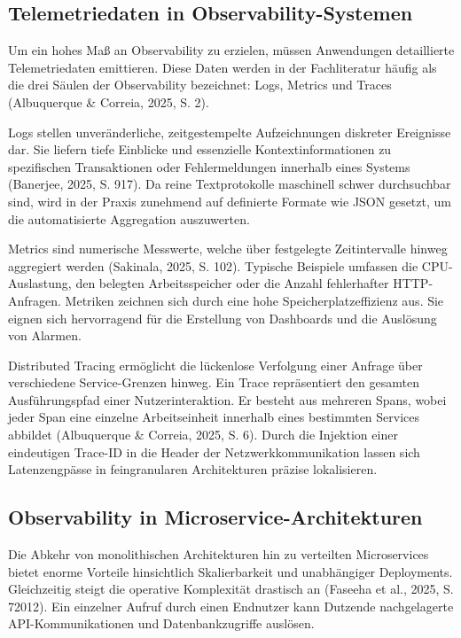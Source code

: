 \subsection{Telemetriedaten in Observability-Systemen}

Um ein hohes Maß an Observability zu erzielen, müssen Anwendungen detaillierte Telemetriedaten emittieren. Diese Daten werden in der Fachliteratur häufig als die drei Säulen der Observability bezeichnet: Logs, Metrics und Traces (Albuquerque \& Correia, 2025, S. 2).

Logs stellen unveränderliche, zeitgestempelte Aufzeichnungen diskreter Ereignisse dar. Sie liefern tiefe Einblicke und essenzielle Kontextinformationen zu spezifischen Transaktionen oder Fehlermeldungen innerhalb eines Systems (Banerjee, 2025, S. 917). Da reine Textprotokolle maschinell schwer durchsuchbar sind, wird in der Praxis zunehmend auf definierte Formate wie JSON gesetzt, um die automatisierte Aggregation auszuwerten.

Metrics sind numerische Messwerte, welche über festgelegte Zeitintervalle hinweg aggregiert werden (Sakinala, 2025, S. 102). Typische Beispiele umfassen die CPU-Auslastung, den belegten Arbeitsspeicher oder die Anzahl fehlerhafter HTTP-Anfragen. Metriken zeichnen sich durch eine hohe Speicherplatzeffizienz aus. Sie eignen sich hervorragend für die Erstellung von Dashboards und die Auslösung von Alarmen.

Distributed Tracing ermöglicht die lückenlose Verfolgung einer Anfrage über verschiedene Service-Grenzen hinweg. Ein Trace repräsentiert den gesamten Ausführungspfad einer Nutzerinteraktion. Er besteht aus mehreren Spans, wobei jeder Span eine einzelne Arbeitseinheit innerhalb eines bestimmten Services abbildet (Albuquerque \& Correia, 2025, S. 6). Durch die Injektion einer eindeutigen Trace-ID in die Header der Netzwerkkommunikation lassen sich Latenzengpässe in feingranularen Architekturen präzise lokalisieren.

\subsection{Observability in Microservice-Architekturen}

Die Abkehr von monolithischen Architekturen hin zu verteilten Microservices bietet enorme Vorteile hinsichtlich Skalierbarkeit und unabhängiger Deployments. Gleichzeitig steigt die operative Komplexität drastisch an (Faseeha et al., 2025, S. 72012). Ein einzelner Aufruf durch einen Endnutzer kann Dutzende nachgelagerte API-Kommunikationen und Datenbankzugriffe auslösen.

